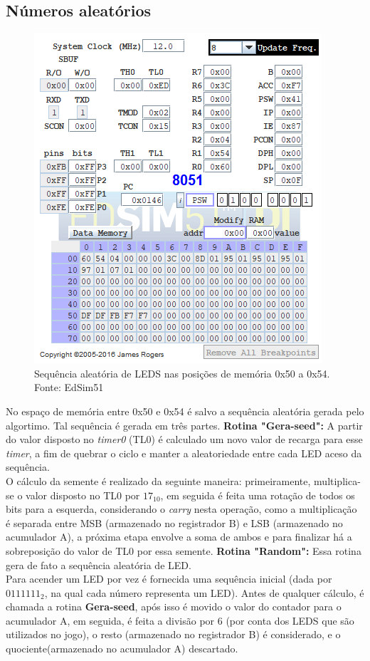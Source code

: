 \documentclass{article}
\begin{document}
\subsection{Números aleatórios}
\begin{figure}[H]
\includegraphics[scale=1]{random.PNG}
\caption{Sequência aleatória de LEDS nas posições de memória 0x50 a 0x54. Fonte: EdSim51}
\end{figure}
No espaço de memória entre 0x50 e 0x54 é salvo a sequência aleatória gerada pelo algortimo.\newline
Tal sequência é gerada em três partes.\newline
\textbf{Rotina "Gera-seed":} A partir do valor disposto no \textit{timer0} (TL0) é calculado um novo valor de recarga para esse \textit{timer}, a fim de quebrar o ciclo e manter a aleatoriedade entre cada LED aceso da sequência.\\ O cálculo da semente é realizado da seguinte maneira: primeiramente, multiplica-se o valor disposto no TL0 por $17_{10}$, em seguida é feita uma rotação de todos os bits para a esquerda, considerando o \textit{carry} nesta operação, como a multiplicação é separada entre MSB (armazenado no registrador B) e LSB (armazenado no acumulador A), a próxima etapa envolve a soma de ambos e para finalizar há a sobreposição do valor de TL0 por essa semente.\newline
\textbf{Rotina "Random":} Essa rotina gera de fato a sequência aleatória de LED.\\Para acender um LED por vez é fornecida uma sequência inicial (dada por $0111111_{2}$, na qual cada número representa um LED). \newline Antes de qualquer cálculo, é chamada a rotina \textbf{Gera-seed}, após isso é movido o valor do contador para o acumulador A, em seguida, é feita a divisão por 6 (por conta dos LEDS que são utilizados no jogo), o resto (armazenado no registrador B) é considerado, e o quociente(armazenado no acumulador A) descartado.\\
\end{document}
